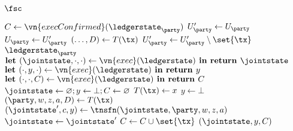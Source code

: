 \begin{functionality}{$\fsc$}
  \begin{helpers}
      \State \Let $C \gets \vn{execConfirmed}(\ledgerstate_\party)$
      \State \Let $U_\party' \gets U_\party$
      \Repeat
        \State \Let $U_\party \gets U_\party'$
          \State \Let $(\ldots, D) \gets T(\tx)$
            \State \Let $U_\party' \gets U_\party' \setminus \set{\tx}$
          \EndIf
        \EndFor
      \State \Return $\ledgerstate_\party$
    \EndProcedure
      \State $\textbf{let }(\jointstate, \cdot, \cdot) \gets \vn{exec}(\ledgerstate)
      \textbf{ in return } \jointstate$
    \EndProcedure
      \State $\textbf{let }(\cdot, y, \cdot) \gets \vn{exec}(\ledgerstate)
      \textbf{ in return } y$
    \EndProcedure
      \State $\textbf{let }(\cdot, \cdot, C) \gets \vn{exec}(\ledgerstate)
      \textbf{ in return } C$
    \EndProcedure
      \State \Let $\jointstate \gets \varnothing; y \gets \bot; C \gets \varnothing$
      \For{$\tx \loopin \ledgerstate$}
          \Continue
        \EndIf
            \State \Let $T(\tx) \gets x$
          \EndIf
        \EndIf
        \State $y \gets \bot$
          \Continue
        \EndIf
        \State \Let $(\party, w, z, a, D) \gets T(\tx)$
          \Continue
        \EndIf
        \State \Let $(\jointstate', c, y) \gets \tnsfn(\jointstate, \party, w, z, a)$
          \Let $\jointstate \gets \jointstate'$
        \EndIf
          \Let $C \gets C \cup \set{\tx}$
        \EndIf
      \EndFor
      \State \Return $(\jointstate, y, C)$
    \EndProcedure
  \end{helpers}
\end{functionality}

